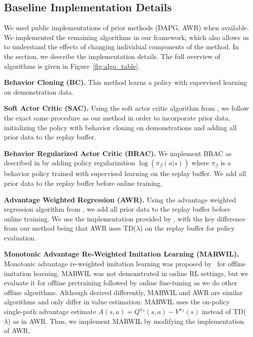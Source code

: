 \subsection{Baseline Implementation Details} \label{sec:baseline_impl}

We used public implementations of prior methods (DAPG, AWR) when available. We implemented the remaining algorithms in our framework, which also allows us to understand the effects of changing individual components of the method. In the section, we describe the implementation details. The full overview of algorithms is given in Figure~\ref{fig:algo_table}.

\textbf{Behavior Cloning (BC).}  This method learns a policy with supervised learning on demonstration data.

\textbf{Soft Actor Critic (SAC).} Using the soft actor critic algorithm from \citep{haarnoja2018sac}, we follow the exact same procedure as our method in order to incorporate prior data, initializing the policy with behavior cloning on demonstrations and adding all prior data to the replay buffer. 

\textbf{Behavior Regularized Actor Critic (BRAC).} We implement BRAC as described in \citep{wu2019brac} by adding policy regularization $\log(\pi_\beta(a|s))$ where $\pi_\beta$ is a behavior policy trained with supervised learning on the replay buffer. We add all prior data to the replay buffer before online training. 

\textbf{Advantage Weighted Regression (AWR).} Using the advantage weighted regression algorithm from \citep{peng2019awr}, we add all prior data to the replay buffer before online training. We use the implementation provided by \citet{peng2019awr}, with the key difference from our method being that AWR uses TD($\lambda$) on the replay buffer for policy evaluation.

\textbf{Monotonic Advantage Re-Weighted Imitation Learning (MARWIL).} Monotonic advantage re-weighted imitation learning was proposed by~\citet{wang2018marwil} for offline imitation learning. MARWIL was not demonstrated in online RL settings, but we evaluate it for offline pretraining followed by online fine-tuning as we do other offline algorithms. Although derived differently, MARWIL and AWR are similar algorithms and only differ in value estimation: MARWIL uses the on-policy single-path advantage estimate $A(s, a) = Q^{\pi_\beta}(s, a) - V^{\pi_\beta}(s)$ instead of TD($\lambda$) as in AWR. Thus, we implement MARWIL by modifying the implementation of AWR.

